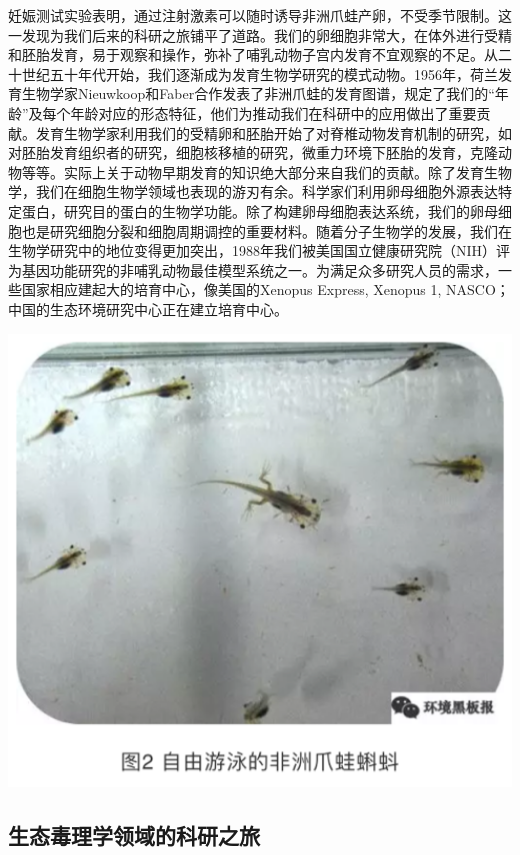 \documentclass[]{book}
\begin{document}
妊娠测试实验表明，通过注射激素可以随时诱导非洲爪蛙产卵，不受季节限制。这一发现为我们后来的科研之旅铺平了道路。我们的卵细胞非常大，在体外进行受精和胚胎发育，易于观察和操作，弥补了哺乳动物子宫内发育不宜观察的不足。从二十世纪五十年代开始，我们逐渐成为发育生物学研究的模式动物。1956年，荷兰发育生物学家Nieuwkoop和Faber合作发表了非洲爪蛙的发育图谱，规定了我们的``年龄''及每个年龄对应的形态特征，他们为推动我们在科研中的应用做出了重要贡献。发育生物学家利用我们的受精卵和胚胎开始了对脊椎动物发育机制的研究，如对胚胎发育组织者的研究，细胞核移植的研究，微重力环境下胚胎的发育，克隆动物等等。实际上关于动物早期发育的知识绝大部分来自我们的贡献。除了发育生物学，我们在细胞生物学领域也表现的游刃有余。科学家们利用卵母细胞外源表达特定蛋白，研究目的蛋白的生物学功能。除了构建卵母细胞表达系统，我们的卵母细胞也是研究细胞分裂和细胞周期调控的重要材料。随着分子生物学的发展，我们在生物学研究中的地位变得更加突出，1988年我们被美国国立健康研究院（NIH）评为基因功能研究的非哺乳动物最佳模型系统之一。为满足众多研究人员的需求，一些国家相应建起大的培育中心，像美国的Xenopus Express, Xenopus 1, NASCO；中国的生态环境研究中心正在建立培育中心。

\includegraphics[width=6.67in]{images/qingwa2}

\hypertarget{ux751fux6001ux6bd2ux7406ux5b66ux9886ux57dfux7684ux79d1ux7814ux4e4bux65c5}{%
\subsection{生态毒理学领域的科研之旅}\label{ux751fux6001ux6bd2ux7406ux5b66ux9886ux57dfux7684ux79d1ux7814ux4e4bux65c5}}
\end{document}
